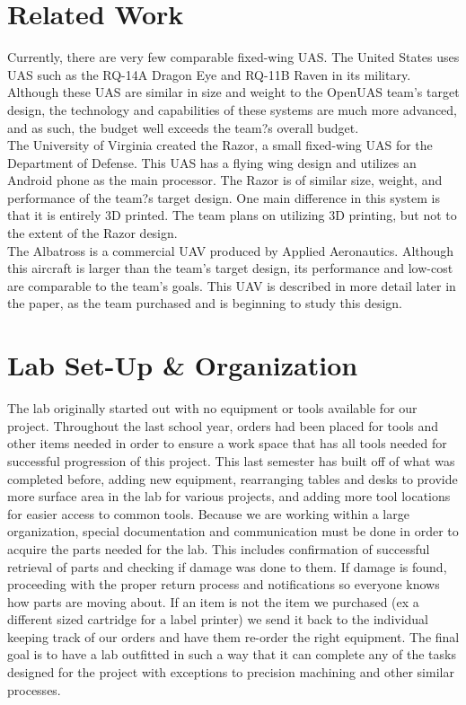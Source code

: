 \documentclass{article}
\begin{document}
\section{Related Work}
\noindent Currently, there are very few comparable fixed-wing UAS. The United States uses UAS such as the RQ-14A Dragon Eye and RQ-11B Raven in its military. Although these UAS are similar in size and weight to the OpenUAS team's target design, the technology and capabilities of these systems are much more advanced, and as such, the budget well exceeds the team?s overall budget.\\

\noindent The University of Virginia created the Razor, a small fixed-wing UAS for the Department of Defense. This UAS has a flying wing design and utilizes an Android phone as the main processor. The Razor is of similar size, weight, and performance of the team?s target design. One main difference in this system is that it is entirely 3D printed. The team plans on utilizing 3D printing, but not to the extent of the Razor design.\\

\noindent The Albatross is a commercial UAV produced by Applied Aeronautics. Although this aircraft is larger than the team's target design, its performance and low-cost are comparable to the team's goals. This UAV is described in more detail later in the paper, as the team purchased and is beginning to study this design. \\


\section{Lab Set-Up \& Organization}
\noindent The lab originally started out with no equipment or tools available for our project. Throughout the last school year, orders had been placed for tools and other items needed in order to ensure a work space that has all tools needed for successful progression of this project. This last semester has built off of what was completed before, adding new equipment, rearranging tables and desks to provide more surface area in the lab for various projects, and adding more tool locations for easier access to common tools.  Because we are working within a large organization, special documentation and communication must be done in order to acquire the parts needed for the lab. This includes confirmation of successful retrieval of parts and checking if damage was done to them. If damage is found, proceeding with the proper return process and notifications so everyone knows how parts are moving about. If an item is not the item we purchased (ex a different sized cartridge for a label printer) we send it back to the individual keeping track of our orders and have them re-order the right equipment. The final goal is to have a lab outfitted in such a way that it can complete any of the tasks designed for the project with exceptions to precision machining and other similar processes.\\
\end{document}
